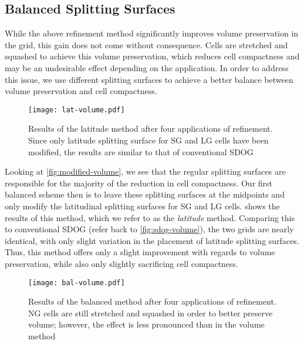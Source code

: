 \subsection{Balanced Splitting Surfaces} \label{chap:4:balanced}
While the above refinement method significantly improves volume preservation in the grid, this gain does not come without consequence.
Cells are stretched and squashed to achieve this volume preservation, which reduces cell compactness and may be an undesirable effect depending on the application.
In order to address this issue, we use different splitting surfaces to achieve a better balance between volume preservation and cell compactness.


\begin{figure}[ht!]
	\centering
	\texttt{[image: lat-volume.pdf]}
	\caption[Visualization of cell volumes in the latitude modification]{
		Results of the latitude method after four applications of refinement.
		Since only latitude splitting surface for SG and LG cells have been modified, the results are similar to that of conventional SDOG
	}
	\label{fig:latitude-volume}
\end{figure}


Looking at \cref{fig:modified-volume}, we see that the regular splitting surfaces are responsible for the majority of the reduction in cell compactness.
Our first balanced scheme then is to leave these splitting surfaces at the midpoints and only modify the latitudinal splitting surfaces for SG and LG cells.
 shows the results of this method, which we refer to as the \textit{latitude} method.
Comparing this to conventional SDOG (refer back to \cref{fig:sdog-volume}), the two grids are nearly identical, with only slight variation in the placement of latitude splitting surfaces.
Thus, this method offers only a slight improvement with regards to volume preservation, while also only slightly sacrificing cell compactness.


\begin{figure}[ht!]
	\centering
	\texttt{[image: bal-volume.pdf]}
	\caption[Visualization of cell volumes in the balanced modification]{
		Results of the balanced method after four applications of refinement.
		NG cells are still stretched and squashed in order to better preserve volume; however, the effect is less pronounced than in the volume method
	}
	\label{fig:balanced-volume}
\end{figure}


